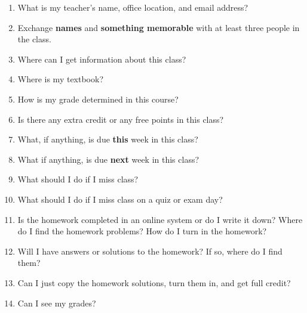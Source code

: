 \documentclass[12pt,fleqn]{article}
\begin{document}
\newcommand{\blank}[1]{\rule{#1}{0.75pt}}
\renewcommand{\d}{\displaystyle}
\begin{center}
  \large {}
\end{center}


\begin{enumerate}
\item What is my teacher's name, office location, and email address?

\vfill

\item Exchange \textbf{names} and \textbf{something memorable} with at least three people in the class. 
\vspace{2in}

\item Where can I get information about this class?\\


\vfill
\item Where is my textbook?\\

\vfill
\item How is my grade determined in this course? \\

\vfill
\item Is there any extra credit or any free points in this class?\\

\vfill
\item What, if anything, is due \textbf{this} week in this class? \\
\vfill
\item What if anything, is due \textbf{next} week in this class? \\
\vfill
\newpage
\item What should I do if I miss class?

\vfill

\item What should I do if I miss class on a quiz or exam day?

\vfill

\item Is the homework completed in an online system or do I write it down? Where do I find the homework problems? How do I turn in the homework?
\vfill
\item Will I have answers or solutions to the homework? If so, where do I find them?\\
\vfill
\item Can I just copy the homework solutions, turn them in, and get full credit? \\
\vfill
\item Can I see my grades?\\
\vfill


\end{enumerate}
\end{document}
